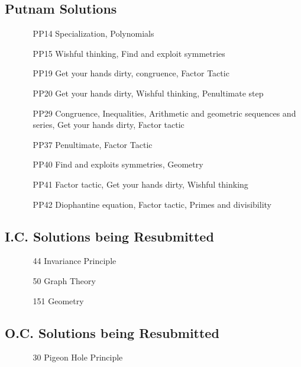 \documentclass[11pt]{article}
\begin{document}
\subsection{Putnam Solutions}
\begin{itemize}
    \item[\text{Nov 29 Sub. }]\begin{itemize}
        \item[PP14] Specialization, Polynomials
        \item[PP15] Wishful thinking, Find and exploit symmetries
    \end{itemize}
    \item[\text{Dec 6 Sub. }]\begin{itemize}
        \item[PP19] Get your hands dirty, congruence, Factor Tactic
        \item[PP20] Get your hands dirty, Wishful thinking, Penultimate step
        \item[PP29] Congruence, Inequalities, Arithmetic and geometric sequences and series, Get your hands dirty, Factor tactic 
        \item[PP37]  Penultimate, Factor Tactic 
        \item[PP40] Find and exploits symmetries, Geometry
        \item[PP41] Factor tactic, Get your hands dirty, Wishful thinking
        \item[PP42] Diophantine equation, Factor tactic, Primes and divisibility 
    \end{itemize}
\end{itemize}

\subsection{I.C. Solutions being Resubmitted} 
\begin{itemize}
    \item[\text{Dec 3 ReSub. }]\begin{itemize}
        \item[44] Invariance Principle
    \item[50] Graph Theory
    \item[151] Geometry
    \end{itemize}
\end{itemize}
\subsection{O.C. Solutions being Resubmitted}
\begin{itemize}
    \item[\text{Dec 3 ReSub.}] \begin{itemize}
        \item[30] Pigeon Hole Principle
    \end{itemize}
\end{itemize}
\end{document}

